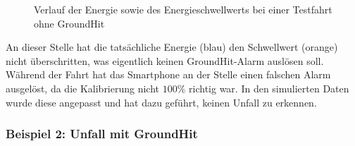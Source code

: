 \begin{figure}[htpb]
	\centering
	\caption{Verlauf der Energie sowie des Energieschwellwerts bei einer Testfahrt ohne GroundHit}
	\label{fig:GH_Testfahrt_noGroundHit_EnergyZoomed}
\end{figure}


An dieser Stelle hat die tatsächliche Energie (blau) den Schwellwert (orange) nicht überschritten, was eigentlich keinen GroundHit-Alarm auslösen soll. Während der Fahrt hat das Smartphone an der Stelle einen falschen Alarm ausgelöst, da die Kalibrierung nicht $100\%$ richtig war. In den simulierten Daten wurde diese angepasst und hat dazu geführt, keinen Unfall zu erkennen.

\subsubsection{Beispiel 2: Unfall mit GroundHit}


